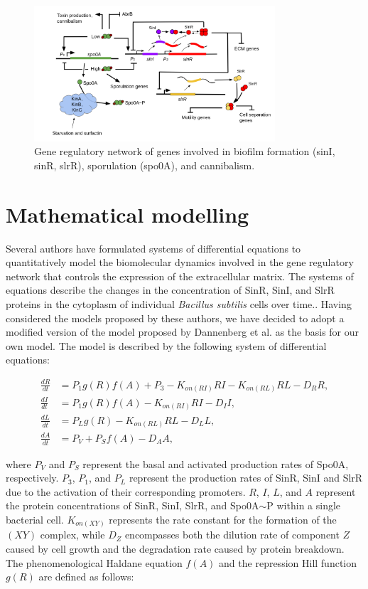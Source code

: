 \begin{figure}[h]
    \centering
    \includegraphics[width=0.8\textwidth]{figures/circuit.png}
    \caption{Gene regulatory network of genes involved in biofilm formation (sinI, sinR, slrR), sporulation (spo0A), and cannibalism.
    }
    \label{fig:circuit}
\end{figure}


\section{Mathematical modelling}\label{sec:litrev:theme2}
Several authors have formulated systems of differential equations to quantitatively model the biomolecular dynamics involved in the gene regulatory network that controls the expression of the extracellular matrix. The systems of equations describe the changes in the concentration of SinR, SinI, and SlrR proteins in the cytoplasm of individual \textit{Bacillus subtilis} cells over time.{\footnotesize\cite{simon}\cite{Voigt2005}\cite{Newman2013}\cite{Chen2023}\cite{Pedreira2021}\cite{Hallinan2010}}. Having considered the models proposed by these authors, we have decided to adopt a modified version of the model proposed by Dannenberg et al. {\footnotesize\cite{simon}} as the basis for our own model. The model is described by the following system of differential equations:

\begin{align}
\frac{dR}{dt} &= P_{1}g(R)f(A)+P_{3} - K_{on(RI)} R I - K_{on(RL)}RL  - D_{R} R, \label{eq:1} \\
\frac{dI}{dt} &= P_{1}g(R)f(A)  - K_{on(RI)} R I - D_{I} I, \label{eq:2} \\
\frac{dL}{dt} &= P_{L}g(R) - K_{on(RL)} RL - D_{L} L , \label{eq:3} \\
\frac{dA}{dt} &= P_V + P_S f(A) - D_A A, \label{eq:4}
\end{align}

where  \(P_V\) and \(P_S\) represent the basal and activated production rates of Spo0A, respectively.
\(P_3\), \(P_1\), and \(P_L\) represent the 
 production rates of SinR, SinI and SlrR due to the activation of their corresponding promoters.
 \(R\), \(I\), \(L\), and \(A\) represent the protein concentrations of SinR, SinI, SlrR, and Spo0A$\sim$P within a single
  bacterial cell. \(K_{on(XY)}\) represents the rate constant for the formation of the $(XY)$ complex,
   while \(D_Z\) encompasses both the dilution rate of component $Z$ caused by cell
    growth and the degradation rate caused by protein breakdown. The phenomenological 
    Haldane equation \(f(A)\) and the repression Hill function \(g(R)\) are defined as follows:


